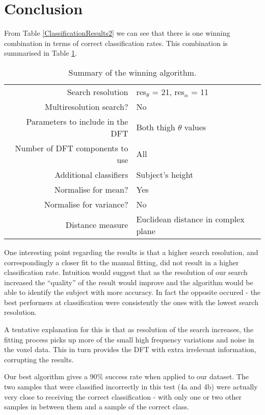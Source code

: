 \section{Conclusion}

From Table \ref{ClassificationResults2} we can see that there is one winning combination in terms of correct classification rates.
This combination is summarised in Table \ref{ConclusionTable}.

\begin{table}[hb]
	\centering
	\begin{tabular}{r|l}
		Search resolution & res$_\theta$ = 21, res$_\alpha$ = 11 \\
		Multiresolution search? & No \\
		Parameters to include in the DFT & Both thigh $\theta$ values\\
		Number of DFT components to use & All \\
		Additional classifiers & Subject's height \\
		Normalise for mean? & Yes \\
		Normalise for variance? & No \\
		Distance measure & Euclidean distance in complex plane
	\end{tabular}
	\caption{Summary of the winning algorithm.}
	\label{ConclusionTable}
\end{table}

One interesting point regarding the results is that a higher search resolution, and correspondingly a closer fit to the manual fitting, did not result in a higher classification rate.
Intuition would suggest that as the resolution of our search increased the ``quality'' of the result would improve and the algorithm would be able to identify the subject with more accuracy.
In fact the opposite occured - the best performers at classification were consistently the ones with the lowest search resolution.

A tentative explanation for this is that as resolution of the search increases, the fitting process picks up more of the small high frequency variations and noise in the voxel data.
This in turn provides the DFT with extra irrelevant information, corrupting the results.

\bigskip
\noindent Our best algorithm gives a 90\% success rate when applied to our dataset.
The two samples that were classified incorrectly in this test (4a and 4b) were actually very close to receiving the correct classification - with only one or two other samples in between them and a sample of the correct class.

